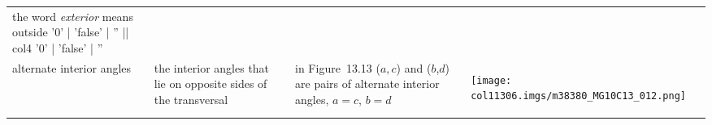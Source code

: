 \begin{table}[H]
\begin{center}
\begin{xtabular*}{\mytablewidth}[t]{|p{3cm}|p{3cm}|p{3cm}|p{20\mystarwidth}|}
    
        the word \textsl{exterior} means outside%
'0' | 'false' | '' || col4 '0' | 'false' | ''
     \tabularnewline{}
    
    
        alternate interior angles &
    
    
        the interior angles that lie on opposite sides of the transversal &
    
    
        in Figure~13.13 (\begin{math}a,c\end{math}) and
(\begin{math}b\end{math},\begin{math}d\end{math}) are pairs of alternate
interior angles, \begin{math}a=c\end{math}, \begin{math}b=d\end{math} &
    
    
        
                  
    \setcounter{subfigure}{0}

\label{m38380*id316794}
    \begin{center}
   
\label{m38380*id316794!!!underscore!!!media}\label{
m38380*id316794!!!underscore!!!printimage}\texttt{[image: 
col11306.imgs/m38380\_MG10C13\_012.png]} %
        

\end{center}
\end{xtabular*}
\end{center}
\end{table}
